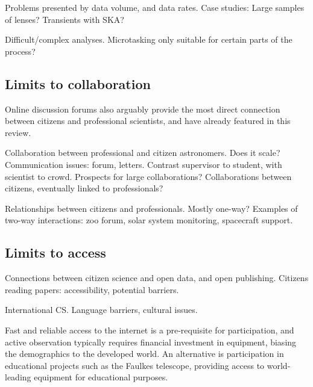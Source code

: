 \documentclass{ar2e}
\begin{document}
Problems presented by data volume, and data rates. 
Case studies: Large samples of lenses?  Transients with SKA? 

Difficult/complex analyses. Microtasking only suitable for certain parts of the
process?



\subsection{Limits to collaboration}
\label{sec:limits:collab}
Online discussion forums also 
arguably provide the most direct connection between citizens and professional
scientists, and have already featured in this review.  

Collaboration between professional and citizen astronomers. Does it scale?
Communication issues: forum, letters. Contrast supervisor to student, with
scientist to crowd. Prospects for large collaborations? Collaborations between
citizens, eventually linked to professionals?

Relationships between citizens and professionals. Mostly one-way? Examples of
two-way interactions: zoo forum, solar system monitoring, spacecraft support.

% 


\subsection{Limits to access}
\label{sec:limits:access}

Connections between citizen science and open data, and open publishing. 
Citizens reading papers: accessibility, potential barriers. 

International CS. Language barriers, cultural issues. 

Fast and reliable access  to the internet is
a pre-requisite for participation, and active  observation typically requires
financial investment in equipment,  biasing the demographics to the developed
world.  An alternative is  participation in educational projects such as the
Faulkes telescope,  providing access to world-leading equipment for
educational purposes.
\end{document}

